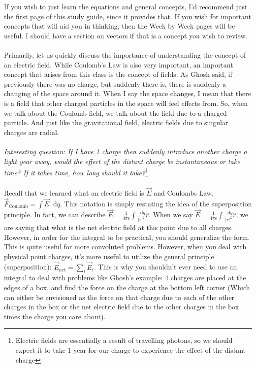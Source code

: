 \documentclass{article}
\newcommand*\dif{\mathop{}\!\mathrm{d}}
\begin{document}
If you wish to just learn the equations and general concepts, I'd recommend just the first page of this study guide, since it provides that. If you wish for important concepts that will aid you in thinking, then the Week by Week pages will be useful. I should have a section on vectors if that is a concept you wish to review. \\
\\
Primarily, let us quickly discuss the importance of understanding the concept of an electric field. While Coulomb's Law is also very important, an important concept that arises from this class is the concept of fields. As Ghosh said, if previously there was no charge, but suddenly there is, there is suddenly a changing of the space around it. When I say the space changes, I mean that there is a field that other charged particles in the space will feel effects from. So, when we talk about the Coulomb field, we talk about the field due to a charged particle. And just like the gravitational field, electric fields due to singular charges are radial.\\
\\
\textit{Interesting question: If I have 1 charge then suddenly introduce another charge a light year away, would the effect of the distant charge be instantaneous or take time? If it takes time, how long should it take?}\footnote{Electric fields are essentially a result of travelling photons, so we should expect it to take 1 year for our charge to experience the effect of the distant charge}\\
\\
Recall that we learned what an electric field is $\vec{E}$ and Coulombs Law, $\vec{F}_{\text{Coulomb}} = \int \vec{E} \dif q$. This notation is simply restating the idea of the superposition principle. In fact, we can describe $\vec{E} = \frac{1}{4\pi\epsilon} \int \frac{\dif q}{|r|^2} \hat{r}$. When we say  $\vec{E} = \frac{1}{4\pi\epsilon} \int \frac{\dif q}{|r|^2}\hat{r}$, we are saying that what is the net electric field at this point due to all charges. However, in order for the integral to be practical, you should generalize the form. This is quite useful for more convoluted problems. However, when you deal with physical point charges, it's more useful to utilize the general principle (superposition): $\vec{E}_{\text{net}} = \sum\limits_{i} \vec{E}_i$. This is why you shouldn't ever need to use an integral to deal with problems like Ghosh's example: 4 charges are placed at the edges of a box, and find the force on the charge at the bottom left corner (Which can either be envisioned as the force on that charge due to each of the other charges in the box or the net electric field due to the other charges in the box times the charge you care about).\\
\end{document}
